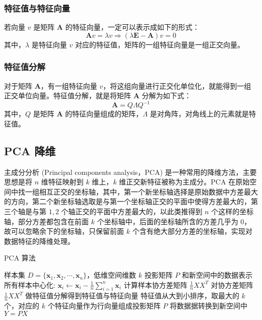 \documentclass[12pt,AutoFakeBold]{article}
\begin{document}
\subsubsection{特征值与特征向量}

若向量 $v$ 是矩阵 $\bm{A}$ 的特征向量，一定可以表示成如下的形式：
%
\begin{equation}
\bm{A}v=\lambda v\Rightarrow (\lambda \bm{E}-\bm{A})v=0
\end{equation}
%
其中，$\lambda$ 是特征向量 $v$ 对应的特征值，矩阵的一组特征向量是一组正交向量。

\subsubsection{特征值分解}

对于矩阵 $\bm{A}$，有一组特征向量 $v$，将这组向量进行正交化单位化，就能得到一组正交单位向量。特征值分解，就是将矩阵 $\bm{A}$ 分解为如下式：
%
\begin{equation}
\bm{A}=Q\Lambda Q^{-1}
\end{equation}
%
其中，$Q$ 是矩阵 $\bm{A}$ 的特征向量组成的矩阵，$\Lambda$ 是对角阵，对角线上的元素就是特征值。

\subsection{PCA 降维}

主成分分析 (Principal components analysis，PCA) 是一种常用的降维方法，主要思想是将 $n$ 维特征映射到 $k$ 维上，$k$ 维正交新特征被称为主成分。PCA 在原始空间中找一组相互正交的坐标轴，其中，第一个新坐标轴选择是原始数据中方差最大的方向，第二个新坐标轴选取是与第一个坐标轴正交的平面中使得方差最大的，第三个轴是与第 $1,2$ 个轴正交的平面中方差最大的，以此类推得到 $n$ 个这样的坐标轴，部分方差都包含在前面 $k$ 个坐标轴中，后面的坐标轴所含的方差几乎为 $0$，故可以忽略余下的坐标轴，只保留前面 $k$ 个含有绝大部分方差的坐标轴，实现对数据特征的降维处理。

\begin{algorithm}[hbtp]
	\caption{PCA 算法} \label{PCA}
	\begin{algorithmic}[1]
	\Require 样本集 $D=\{\bm{x}_1,\bm{x}_2,\cdots,\bm{x}_n\}$，低维空间维数 $k$
	\Ensure 投影矩阵 $P$ 和新空间中的数据表示
	\State 所有样本中心化: $\bm{x}_i\leftarrow \bm{x}_i-\frac{1}{n}\sum_{i=1}^n\bm{x}_i$
	\State 计算样本协方差矩阵 $\frac{1}{n}XX^T$
	\State 对协方差矩阵 $\frac{1}{n}XX^T$ 做特征值分解得到特征值与特征向量
	\State 特征值从大到小排序，取最大的 $k$ 个，对应的 $k$ 个特征向量作为行向量组成投影矩阵 $P$
	\State 将数据据转换到新空间中 $Y=PX$
	\end{algorithmic}
\end{algorithm}
\end{document}
